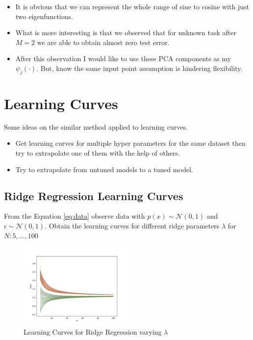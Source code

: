 \documentclass{tran-l}
\theoremstyle{definition}
\theoremstyle{remark}
\numberwithin{equation}{section}
\begin{document}
\begin{itemize}
  \item It is obvious that we can represent the whole range of sine to cosine with just two eigenfunctions. 
  \item What is more interesting is that we observed that for unknown task after $M=2$ we are able to obtain almost zero test error.
  \item After this observation I would like to use these PCA components as my $\psi_j(\cdot)$. But, know the same input point assumption is hindering flexibility.
\end{itemize}

\section{Learning Curves}

Some ideas on the similar method applied to learning curves.
\begin{itemize}
  \item Get learning curves for multiple hyper parameters for the same dataset then try to extrapolate one of them with the help of others.
  \item Try to extrapolate from untuned models to a tuned model.
\end{itemize}

\subsection{Ridge Regression Learning Curves}

From the Equation \ref{eq:data} observe data with $p(x)\sim\mathcal{N}(0,1)$ and $\epsilon\sim\mathcal{N}(0,1)$. Obtain the learning curves for different ridge parameters $\lambda$ for $N:{5,...,100}$

\begin{figure}[h!]
   \centering
   \includegraphics[width=0.5\textwidth]{Figures/initial_study/lr_learning_curves.pdf}
   \caption{Learning Curves for Ridge Regression varying $\lambda$}
\end{figure}
\end{document}

